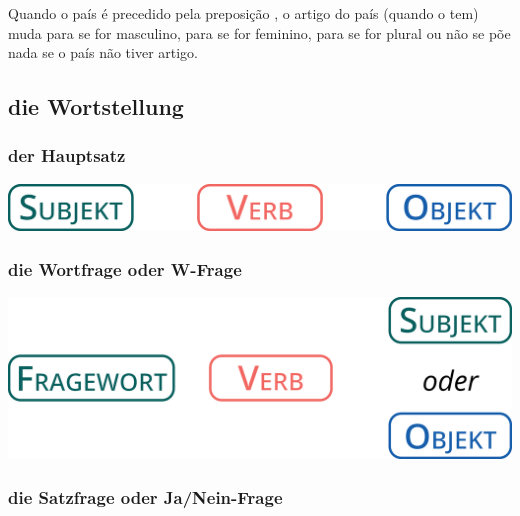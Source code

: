         Quando o país é precedido pela preposição , o artigo do país (quando o tem) muda para  se for masculino, para  se for feminino, para  se for plural ou não se põe nada se o país não tiver artigo.

    \subsection{die Wortstellung}\label{subsection:deutsch:wortstellung}

    
            \begin{multicols}{3}
                \raggedcolumns
                \subsubsection{der Hauptsatz}
    
    
                    \includegraphics[width=.9\linewidth]{figures/dieHauptsatz.eps}
                    \label{fig:languages:deutsch:dieHauptsatz}
    
                \columnbreak
                \subsubsection{die Wortfrage oder W-Frage}
    
    
                    \includegraphics[width=.9\linewidth]{figures/dieWortfrage.eps}
                    \label{fig:languages:deutsch:dieWortfrage}
                \columnbreak
                \subsubsection{die Satzfrage oder Ja/Nein-Frage}
    

\end{multicols}
